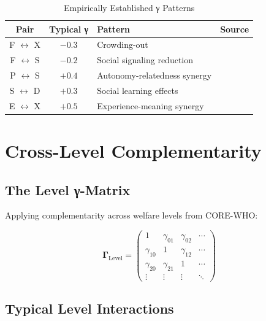 \begin{table}[htbp]
\centering
\caption{Empirically Established γ Patterns}
\label{tab:how-empirical-gamma}
\renewcommand{\arraystretch}{1.3}
\begin{tabular}{@{}cclc@{}}
\toprule
\textbf{Pair} & \textbf{Typical γ} & \textbf{Pattern} & \textbf{Source} \\
\midrule
F $\leftrightarrow$ X & $-0.3$ & Crowding-out & \citet{frey1997relationship} \\
F $\leftrightarrow$ S & $-0.2$ & Social signaling reduction & \citet{gneezy2011pay} \\
P $\leftrightarrow$ S & $+0.4$ & Autonomy-relatedness synergy & \citet{ryan2000self} \\
S $\leftrightarrow$ D & $+0.3$ & Social learning effects & \citet{bandura1977social} \\
E $\leftrightarrow$ X & $+0.5$ & Experience-meaning synergy & \citet{kahneman1999wellbeing} \\
\bottomrule
\end{tabular}
\end{table}


\section{Cross-Level Complementarity}
\label{sec:how-level}

\subsection{The Level γ-Matrix}

Applying complementarity across welfare levels from CORE-WHO:

\begin{equation}
\mathbf{\Gamma}_{\text{Level}} = \begin{pmatrix}
1 & \gamma_{01} & \gamma_{02} & \cdots \\
\gamma_{10} & 1 & \gamma_{12} & \cdots \\
\gamma_{20} & \gamma_{21} & 1 & \cdots \\
\vdots & \vdots & \vdots & \ddots
\end{pmatrix}
\end{equation}

\subsection{Typical Level Interactions}

